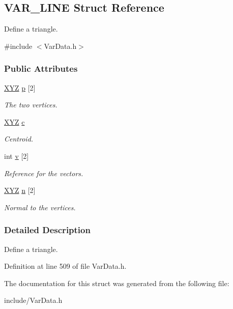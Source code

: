 \hypertarget{structVAR__LINE}{\subsection{\-V\-A\-R\-\_\-\-L\-I\-N\-E \-Struct \-Reference}
\label{structVAR__LINE}
}


\-Define a triangle.  




{\ttfamily \#include $<$\-Var\-Data.\-h$>$}

\subsubsection*{\-Public \-Attributes}
\begin{DoxyCompactItemize}
\item 
\hypertarget{structVAR__LINE_a411315336ef1ae37448e44ee3cc83503}{\hyperlink{structXYZ}{\-X\-Y\-Z} \hyperlink{structVAR__LINE_a411315336ef1ae37448e44ee3cc83503}{p} \mbox{[}2\mbox{]}}\label{structVAR__LINE_a411315336ef1ae37448e44ee3cc83503}

\begin{DoxyCompactList}\small\item\em \-The two vertices. \end{DoxyCompactList}\item 
\hypertarget{structVAR__LINE_ae93aa7b3bc74295f6f1118a6b0a0e804}{\hyperlink{structXYZ}{\-X\-Y\-Z} \hyperlink{structVAR__LINE_ae93aa7b3bc74295f6f1118a6b0a0e804}{c}}\label{structVAR__LINE_ae93aa7b3bc74295f6f1118a6b0a0e804}

\begin{DoxyCompactList}\small\item\em \-Centroid. \end{DoxyCompactList}\item 
\hypertarget{structVAR__LINE_aa8fc460cb352395b8303f6bd1f49c9ad}{int \hyperlink{structVAR__LINE_aa8fc460cb352395b8303f6bd1f49c9ad}{v} \mbox{[}2\mbox{]}}\label{structVAR__LINE_aa8fc460cb352395b8303f6bd1f49c9ad}

\begin{DoxyCompactList}\small\item\em \-Reference for the vectors. \end{DoxyCompactList}\item 
\hypertarget{structVAR__LINE_a5da38476370426c07250979c5c998715}{\hyperlink{structXYZ}{\-X\-Y\-Z} \hyperlink{structVAR__LINE_a5da38476370426c07250979c5c998715}{n} \mbox{[}2\mbox{]}}\label{structVAR__LINE_a5da38476370426c07250979c5c998715}

\begin{DoxyCompactList}\small\item\em \-Normal to the vertices. \end{DoxyCompactList}\end{DoxyCompactItemize}


\subsubsection{\-Detailed \-Description}
\-Define a triangle. 

\-Definition at line 509 of file \-Var\-Data.\-h.



\-The documentation for this struct was generated from the following file\-:\begin{DoxyCompactItemize}
\item 
include/\-Var\-Data.\-h\end{DoxyCompactItemize}
